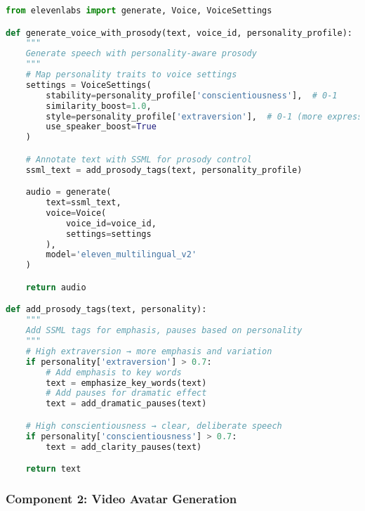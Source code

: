 \documentclass[10pt]{article}
\begin{document}
\begin{lstlisting}[language=Python]
from elevenlabs import generate, Voice, VoiceSettings

def generate_voice_with_prosody(text, voice_id, personality_profile):
    """
    Generate speech with personality-aware prosody
    """
    # Map personality traits to voice settings
    settings = VoiceSettings(
        stability=personality_profile['conscientiousness'],  # 0-1
        similarity_boost=1.0,
        style=personality_profile['extraversion'],  # 0-1 (more expressive if high)
        use_speaker_boost=True
    )

    # Annotate text with SSML for prosody control
    ssml_text = add_prosody_tags(text, personality_profile)

    audio = generate(
        text=ssml_text,
        voice=Voice(
            voice_id=voice_id,
            settings=settings
        ),
        model='eleven_multilingual_v2'
    )

    return audio

def add_prosody_tags(text, personality):
    """
    Add SSML tags for emphasis, pauses based on personality
    """
    # High extraversion → more emphasis and variation
    if personality['extraversion'] > 0.7:
        # Add emphasis to key words
        text = emphasize_key_words(text)
        # Add pauses for dramatic effect
        text = add_dramatic_pauses(text)

    # High conscientiousness → clear, deliberate speech
    if personality['conscientiousness'] > 0.7:
        text = add_clarity_pauses(text)

    return text
\end{lstlisting}

\subsubsection{Component 2: Video Avatar Generation}
\end{document}
